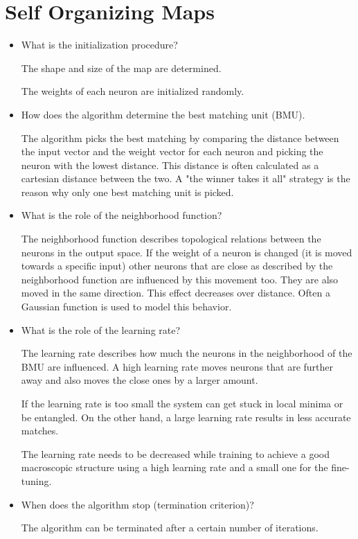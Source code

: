 \documentclass[a4paper, 11pt]{article}
\begin{document}
\section{Self Organizing Maps}

\begin{itemize}
  \item What is the initialization procedure?

    The shape and size of the map are determined.

    The weights of each neuron are initialized randomly.

  \item How does the algorithm determine the best matching unit (BMU).

    The algorithm picks the best matching by comparing the distance between the input vector and the weight vector for each neuron and picking the neuron with the lowest distance.
    This distance is often calculated as a cartesian distance between the two.
    A "the winner takes it all" strategy is the reason why only one best matching unit is picked.

  \item What is the role of the neighborhood function?

    The neighborhood function describes topological relations between the neurons in the output space.
    If the weight of a neuron is changed (it is moved towards a specific input) other neurons that are close as described by the neighborhood function are influenced by this movement too.
    They are also moved in the same direction.
    This effect decreases over distance.
    Often a Gaussian function is used to model this behavior.

  \item What is the role of the learning rate?

    The learning rate describes how much the neurons in the neighborhood of the BMU are influenced.
    A high learning rate moves neurons that are further away and also moves the close ones by a larger amount.

    If the learning rate is too small the system can get stuck in local minima or be entangled.
    On the other hand, a large learning rate results in less accurate matches.

    The learning rate needs to be decreased while training to achieve a good macroscopic structure using a high learning rate and a small one for the fine-tuning.

  \item When does the algorithm stop (termination criterion)?

    The algorithm can be terminated after a certain number of iterations.
\end{itemize}
\end{document}
